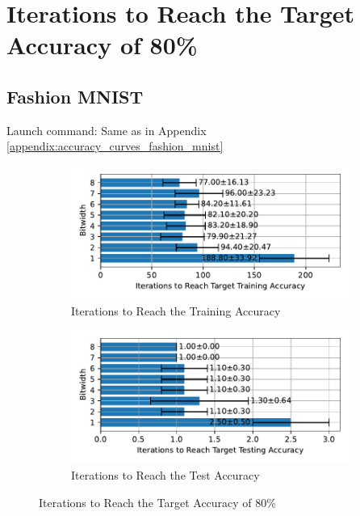 \section{Iterations to Reach the Target Accuracy of 80\%}
\label{appendix:iterations}

    \subsection{Fashion MNIST}
    \label{appendix:iterations_fashion_mnist}
        Launch command: Same as in Appendix \ref{appendix:accuracy_curves_fashion_mnist}
        \begin{figure}[H]
            \centering
            \begin{subfigure}[H]{0.495\textwidth}
                \centering
                \includegraphics[width=\textwidth]{../standard/FashionMNIST/plots/fashionmnist_train_iters_horizontal.pdf}
                \caption{Iterations to Reach the Training Accuracy}
            \end{subfigure}
            \hfill
            \begin{subfigure}[H]{0.495\textwidth}
                \centering
                \includegraphics[width=\textwidth]{../standard/FashionMNIST/plots/fashionmnist_test_iters_horizontal.pdf}
                \caption{Iterations to Reach the Test Accuracy}
            \end{subfigure}
            \caption{Iterations to Reach the Target Accuracy of 80\%}
        \end{figure}

